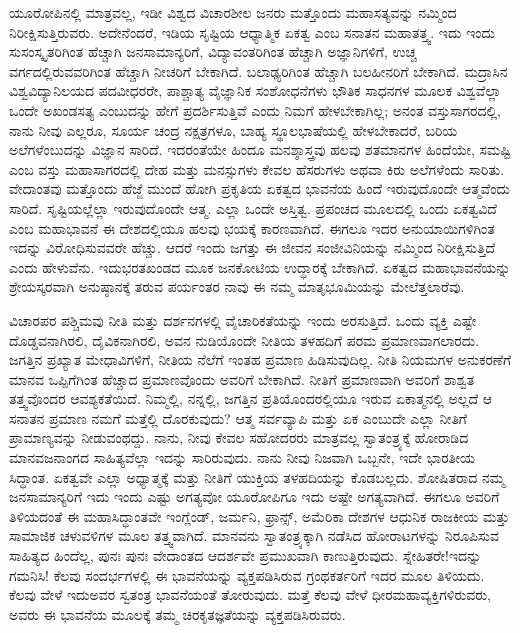ಯೂರೋಪಿನಲ್ಲಿ ಮಾತ್ರವಲ್ಲ, ಇಡೀ ವಿಶ್ವದ ವಿಚಾರಶೀಲ ಜನರು ಮತ್ತೊಂದು ಮಹಾಸತ್ಯವನ್ನು ನಮ್ಮಿಂದ ನಿರೀಕ್ಷಿಸುತ್ತಿರುವರು. ಅದೇನೆಂದರೆ, ಇಡಿಯ ಸೃಷ್ಟಿಯ ಆಧ್ಯಾತ್ಮಿಕ ಏಕತ್ವ ಎಂಬ ಸನಾತನ ಮಹಾತತ್ತ್ವ. ಇದು ಇಂದು ಸುಸಂಸ್ಕೃತರಿಗಿಂತ ಹೆಚ್ಚಾಗಿ ಜನಸಾಮಾನ್ಯರಿಗೆ, ವಿದ್ಯಾವಂತರಿಗಿಂತ ಹೆಚ್ಚಾಗಿ ಅಜ್ಞಾನಿಗಳಿಗೆ, ಉಚ್ಚ ವರ್ಗದಲ್ಲಿರುವವರಿಗಿಂತ ಹೆಚ್ಚಾಗಿ ನೀಚರಿಗೆ ಬೇಕಾಗಿದೆ. ಬಲಾಢ್ಯರಿಗಿಂತ ಹೆಚ್ಚಾಗಿ ಬಲಹೀನರಿಗೆ ಬೇಕಾಗಿದೆ. ಮದ್ರಾಸಿನ ವಿಶ್ವವಿದ್ಯಾನಿಲಯದ ಪದವೀಧರರೇ, ಪಾಶ್ಚಾತ್ಯ ವೈಜ್ಞಾನಿಕ ಸಂಶೋಧನೆಗಳು ಭೌತಿಕ ಸಾಧನಗಳ ಮೂಲಕ ವಿಶ್ವವೆಲ್ಲಾ ಒಂದೇ ಅಖಂಡಸತ್ಯ ಎಂಬುದನ್ನು ಹೇಗೆ ಪ್ರದರ್ಶಿಸುತ್ತಿವೆ ಎಂದು ನಿಮಗೆ ಹೇಳಬೇಕಾಗಿಲ್ಲ; ಅನಂತ ವಸ್ತುಸಾಗರದಲ್ಲಿ, ನಾನು ನೀವು ಎಲ್ಲರೂ, ಸೂರ್ಯ ಚಂದ್ರ ನಕ್ಷತ್ರಗಳೂ, ಬಾಹ್ಯ ಸ್ಥೂಲಭಾಷೆಯಲ್ಲಿ ಹೇಳಬೇಕಾದರೆ, ಬರಿಯ ಅಲೆಗಳೆಂಬುದನ್ನು ವಿಜ್ಞಾನ ಸಾರಿದೆ. ಇದರಂತೆಯೇ ಹಿಂದೂ ಮನಶ್ಶಾಸ್ತ್ರವು ಹಲವು ಶತಮಾನಗಳ ಹಿಂದೆಯೇ, ಸಮಷ್ಟಿ ಎಂಬ ವಸ್ತು ಮಹಾಸಾಗರದಲ್ಲಿ ದೇಹ ಮತ್ತು ಮನಸ್ಸುಗಳು ಕೇವಲ ಹೆಸರುಗಳು ಅಥವಾ ಕಿರು ಅಲೆಗಳೆಂದು ಸಾರಿತು. ವೇದಾಂತವು ಮತ್ತೊಂದು ಹೆಜ್ಜೆ ಮುಂದೆ ಹೋಗಿ ಪ್ರಕೃತಿಯ ಏಕತ್ವದ ಭಾವನೆಯ ಹಿಂದೆ ಇರುವುದೊಂದೇ ಆತ್ಮವೆಂದು ಸಾರಿದೆ. ಸೃಷ್ಟಿಯಲ್ಲೆಲ್ಲಾ ಇರುವುದೊಂದೇ ಆತ್ಮ. ಎಲ್ಲಾ ಒಂದೇ ಅಸ್ತಿತ್ವ. ಪ್ರಪಂಚದ ಮೂಲದಲ್ಲಿ ಒಂದು ಏಕತ್ವವಿದೆ ಎಂಬ ಮಹಾಭಾವನೆ ಈ ದೇಶದಲ್ಲಿಯೂ ಹಲವು ಭಯಕ್ಕೆ ಕಾರಣವಾಗಿದೆ. ಈಗಲೂ ಇದರ ಅನುಯಾಯಿಗಳಿಗಿಂತ ಇದನ್ನು ವಿರೋಧಿಸುವವರೇ ಹೆಚ್ಚು. ಆದರೆ ಇಂದು ಜಗತ್ತು ಈ ಜೀವನ ಸಂಜೀವಿನಿಯನ್ನು ನಮ್ಮಿಂದ ನಿರೀಕ್ಷಿಸುತ್ತಿದೆ ಎಂದು ಹೇಳುವೆನು. ಇದು\break ಭರತಖಂಡದ ಮೂಕ ಜನಕೋಟಿಯ ಉದ್ಧಾರಕ್ಕೆ ಬೇಕಾಗಿದೆ. ಏಕತ್ವದ ಮಹಾಭಾವನೆಯನ್ನು ಶ್ರೇಯಸ್ಕರವಾಗಿ ಅನುಷ್ಠಾನಕ್ಕೆ ತರುವ ಪರ್ಯಂತರ ನಾವು ಈ ನಮ್ಮ ಮಾತೃಭೂಮಿಯನ್ನು ಮೇಲೆತ್ತಲಾರೆವು.

\vskip 3pt

ವಿಚಾರಪರ ಪಶ್ಚಿಮವು ನೀತಿ ಮತ್ತು ದರ್ಶನಗಳಲ್ಲಿ ವೈಚಾರಿಕತೆಯನ್ನು ಇಂದು ಅರಸುತ್ತಿದೆ. ಒಂದು ವ್ಯಕ್ತಿ ಎಷ್ಟೇ ದೊಡ್ಡವನಾಗಿರಲಿ, ದೈವಿಕನಾಗಿರಲಿ, ಅವನ ನುಡಿಯೊಂದೇ ನೀತಿಯ ತಳಹದಿಗೆ ಪರಮ ಪ್ರಮಾಣವಾಗಲಾರದು. ಜಗತ್ತಿನ ಪ್ರಖ್ಯಾತ ಮೇಧಾವಿಗಳಿಗೆ, ನೀತಿಯ ನೆಲೆಗೆ ಇಂತಹ ಪ್ರಮಾಣ ಹಿಡಿಸುವುದಿಲ್ಲ. ನೀತಿ ನಿಯಮಗಳ ಅನುಕರಣೆಗೆ ಮಾನವ ಒಪ್ಪಿಗೆ\-ಗಿಂತ ಹೆಚ್ಚಾದ ಪ್ರಮಾಣವೊಂದು ಅವರಿಗೆ ಬೇಕಾಗಿದೆ. ನೀತಿಗೆ ಪ್ರಮಾಣವಾಗಿ ಅವರಿಗೆ ಶಾಶ್ವತ ತತ್ತ್ವವೊಂದರ ಆವಶ್ಯಕತೆಯಿದೆ. ನಿಮ್ಮಲ್ಲಿ, ನನ್ನಲ್ಲಿ, ಜಗತ್ತಿನ ಪ್ರತಿಯೊಂದರಲ್ಲಿಯೂ ಇರುವ ಏಕಾತ್ಮನಲ್ಲಿ ಅಲ್ಲದೆ ಆ ಸನಾತನ ಪ್ರಮಾಣ ನಮಗೆ ಮತ್ತೆಲ್ಲಿ ದೊರಕುವುದು? ಆತ್ಮ ಸರ್ವವ್ಯಾಪಿ ಮತ್ತು ಏಕ ಎಂಬುದೇ ಎಲ್ಲಾ ನೀತಿಗೆ ಪ್ರಾಮಾಣ್ಯವನ್ನು ನೀಡುವಂಥದ್ದು. ನಾನು, ನೀವು ಕೇವಲ ಸಹೋದರರು ಮಾತ್ರವಲ್ಲ ಸ್ವಾತಂತ್ರ್ಯಕ್ಕೆ ಹೋರಾಡಿದ ಮಾನವಜನಾಂಗದ ಸಾಹಿತ್ಯವೆಲ್ಲಾ ಇದನ್ನು ಸಾರಿರುವುದು. ನಾನು ನೀವು ನಿಜವಾಗಿ ಒಬ್ಬನೇ, ಇದೇ ಭಾರತೀಯ ಸಿದ್ಧಾಂತ. ಏಕತ್ವವೇ ಎಲ್ಲಾ ಅಧ್ಯಾತ್ಮಕ್ಕೆ ಮತ್ತು ನೀತಿಗೆ ಯುಕ್ತಿಯ ತಳಹದಿಯನ್ನು ಕೊಡಬಲ್ಲದು. ಶೋಷಿತರಾದ ನಮ್ಮ ಜನಸಾಮಾನ್ಯರಿಗೆ ಇದು ಇಂದು ಎಷ್ಟು ಅಗತ್ಯವೋ ಯೂರೋಪಿಗೂ ಇದು ಅಷ್ಟೇ ಅಗತ್ಯವಾಗಿದೆ. ಈಗಲೂ ಅವರಿಗೆ ತಿಳಿಯದಂತೆ ಈ ಮಹಾಸಿದ್ಧಾಂತವೇ ಇಂಗ್ಲೆಂಡ್​, ಜರ್ಮನಿ, ಫ್ರಾನ್ಸ್, ಅಮೆರಿಕಾ ದೇಶಗಳ ಆಧುನಿಕ ರಾಜಕೀಯ ಮತ್ತು ಸಾಮಾಜಿಕ ಚಳುವಳಿಗಳ ಮೂಲ ತತ್ತ್ವವಾಗಿದೆ. ಮಾನವನು ಸ್ವಾತಂತ್ರ್ಯಕ್ಕಾಗಿ ನಡೆಸಿದ ಹೋರಾಟಗಳನ್ನು ನಿರೂಪಿಸುವ ಸಾಹಿತ್ಯದ ಹಿಂದೆಲ್ಲ, ಪುನಃ ಪುನಃ ವೇದಾಂತದ ಆದರ್ಶವೇ ಪ್ರಮುಖವಾಗಿ ಕಾಣುತ್ತಿರುವುದು. ಸ್ನೇಹಿತರೇ!\break ಇದನ್ನು ಗಮನಿಸಿ! ಕೆಲವು ಸಂದರ್ಭಗಳಲ್ಲಿ ಈ ಭಾವನೆಯನ್ನು ವ್ಯಕ್ತಪಡಿ\break ಸಿರುವ ಗ್ರಂಥಕರ್ತರಿಗೆ ಇದರ ಮೂಲ ತಿಳಿಯದು. ಕೆಲವು ವೇಳೆ ಇದು\break ಅವರ ಸ್ವತಂತ್ರ ಭಾವನೆಯಂತೆ ತೋರುವುದು. ಮತ್ತೆ ಕೆಲವು ವೇಳೆ ಧೀರ\break ಮಹಾವ್ಯಕ್ತಿಗಳಿರುವರು, ಅವರು ಈ ಭಾವನೆಯ ಮೂಲಕ್ಕೆ ತಮ್ಮ ಚಿರಕೃತಜ್ಞತೆಯನ್ನು ವ್ಯಕ್ತಪಡಿಸಿರುವರು.

